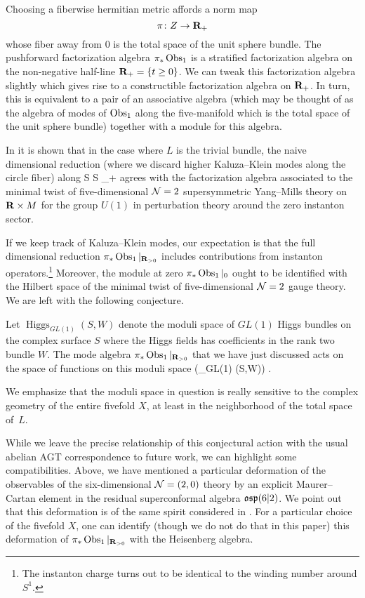 Choosing a fiberwise hermitian metric affords a norm map 
\[
\pi \colon Z \to \mathbf{R}_{+}
\] 
whose fiber away from $0$ is the total space of the unit sphere bundle.
The pushforward factorization algebra $\pi_{*}\operatorname{Obs}_{1}$ is a stratified factorization algebra on the non-negative half-line $\mathbf{R}_+ = \{t \geq 0\}$. 
We can tweak this factorization algebra slightly which gives rise to a constructible factorization algebra on $\mathbf{R}_+$.
In turn, this is equivalent to a pair of an associative algebra (which may be thought of as the algebra of modes of $\operatorname{Obs}_{1}$ along the five-manifold which is the total space of the unit sphere bundle) together with a module for this algebra.

In \cite{SWtensor} it is shown that in the case where $L$ is the trivial bundle, the naive dimensional reduction (where we discard higher Kaluza--Klein modes along the circle fiber) along 
\beqn
S \times \C \to S \times \R_+
\eeqn
agrees with the factorization algebra associated to the minimal twist of five-dimensional $\mathcal N = 2$ supersymmetric Yang--Mills theory on $\mathbf{R}\times M$ for the group $U(1)$ in perturbation theory around the zero instanton sector.

If we keep track of Kaluza--Klein modes, our expectation is that the full dimensional reduction $\pi_{*}\operatorname{Obs}_{1}|_{\mathbf{R}_{>0}}$ includes contributions from instanton operators.\footnote{The instanton charge turns out to be identical to the winding number around $S^1$.} Moreover, the module at zero $\pi_{*}\operatorname{Obs}_{1}|_{0}$ ought to be identified with the Hilbert space of the minimal twist of five-dimensional $\mathcal N = 2$ gauge theory. We are left with the following conjecture.

\begin{conj}
\label{conj:AGT1}
Let $\operatorname{Higgs}_{GL(1)} (S,W)$ denote the moduli space of $GL(1)$ Higgs bundles on the complex surface $S$ where the Higgs fields has coefficients in the rank two bundle $W$.
The mode algebra $\pi_{*}\operatorname{Obs}_{1}|_{\mathbf{R}_{>0}}$ that we have just discussed acts on the space of functions on this moduli space
\beqn
\cO \left(_{GL(1)} (S,W)\right) .
\eeqn
\end{conj}

We emphasize that the moduli space in question is really sensitive to the complex geometry of the entire fivefold $X$, at least in the neighborhood of the total space of~$L$.

While we leave the precise relationship of this conjectural action with the usual abelian AGT correspondence to future work, we can highlight some compatibilities. Above, we have mentioned a particular deformation of the observables of the six-dimensional $\mathcal N = (2,0)$ theory by an explicit Maurer--Cartan element in the residual superconformal algebra $\mathfrak{osp}(6|2)$. We point out that this deformation is of the same spirit considered in \cite{BeemEtAl}. For a particular choice of the fivefold $X$, one can identify (though we do not do that in this paper) this deformation of $\pi_{*} \operatorname{Obs}_1|_{\mathbf{R}_{>0}}$ with the Heisenberg algebra.

